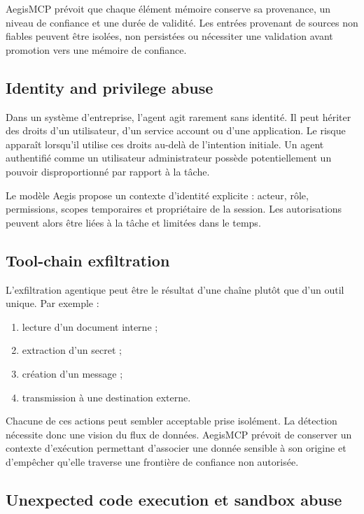 AegisMCP prévoit que chaque élément mémoire conserve sa provenance, un niveau de confiance et une durée de validité. Les entrées provenant de sources non fiables peuvent être isolées, non persistées ou nécessiter une validation avant promotion vers une mémoire de confiance.

\subsection{Identity and privilege abuse}

Dans un système d'entreprise, l'agent agit rarement sans identité. Il peut hériter des droits d'un utilisateur, d'un service account ou d'une application. Le risque apparaît lorsqu'il utilise ces droits au-delà de l'intention initiale. Un agent authentifié comme un utilisateur administrateur possède potentiellement un pouvoir disproportionné par rapport à la tâche.

Le modèle Aegis propose un contexte d'identité explicite : acteur, rôle, permissions, scopes temporaires et propriétaire de la session. Les autorisations peuvent alors être liées à la tâche et limitées dans le temps.

\subsection{Tool-chain exfiltration}

L'exfiltration agentique peut être le résultat d'une chaîne plutôt que d'un outil unique. Par exemple :

\begin{enumerate}
    \item lecture d'un document interne ;
    \item extraction d'un secret ;
    \item création d'un message ;
    \item transmission à une destination externe.
\end{enumerate}

Chacune de ces actions peut sembler acceptable prise isolément. La détection nécessite donc une vision du flux de données. AegisMCP prévoit de conserver un contexte d'exécution permettant d'associer une donnée sensible à son origine et d'empêcher qu'elle traverse une frontière de confiance non autorisée.

\subsection{Unexpected code execution et sandbox abuse}

